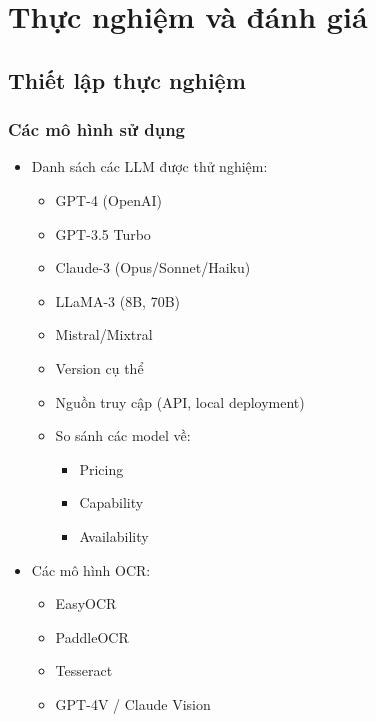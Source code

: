 
\chapter{Thực nghiệm và đánh giá}

\section{Thiết lập thực nghiệm}

\subsection{Các mô hình sử dụng}
\begin{itemize}
    \item Danh sách các LLM được thử nghiệm:
    \begin{itemize}
        \item GPT-4 (OpenAI)
        \item GPT-3.5 Turbo
        \item Claude-3 (Opus/Sonnet/Haiku)
        \item LLaMA-3 (8B, 70B)
        \item Mistral/Mixtral
    \end{itemize}
    \begin{itemize}
        \item Version cụ thể
    \end{itemize}
    \begin{itemize}
        \item Nguồn truy cập (API, local deployment)
    \end{itemize}
    \begin{itemize}
        \item So sánh các model về:
        \begin{itemize}
            \item Pricing
            \item Capability
            \item Availability
        \end{itemize}
    \end{itemize}
    \item Các mô hình OCR:
    \begin{itemize}
        \item EasyOCR
        \item PaddleOCR
        \item Tesseract
    \end{itemize}
    \begin{itemize}
        \item GPT-4V / Claude Vision
    \end{itemize}
\end{itemize}

